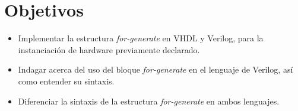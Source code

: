 \section{Objetivos \label{sec:obj}}


\begin{itemize} 
	\item Implementar la estructura \textit{for-generate} en VHDL y Verilog, para la instanciación de hardware previamente declarado.
	
	\item Indagar acerca del uso del bloque \textit{for-generate} en el lenguaje de Verilog, así como entender su sintaxis.
	
	\item Diferenciar la sintaxis de la estructura \textit{for-generate} en ambos lenguajes.
\end{itemize}